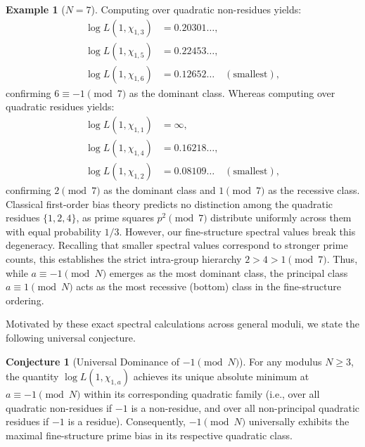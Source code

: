 \documentclass[12pt,reqno]{amsart}
\theoremstyle{definition}
\newtheorem{example}{Example}
\newtheorem{conjecture}[theorem]{Conjecture}
\theoremstyle{remark}
\numberwithin{equation}{section}
\begin{document}
\begin{example}[$N = 7$]
Computing over quadratic non-residues yields:
\begin{align*}
\log L(1, \chi_{1,3}) &= 0.20301\dots, \\
\log L(1, \chi_{1,5}) &= 0.22453\dots, \\
\log L(1, \chi_{1,6}) &= 0.12652\dots \quad (\text{smallest}),
\end{align*}
confirming $6 \equiv -1 \pmod 7$ as the dominant class. 
Whereas computing over quadratic residues yields:
\begin{align*}
\log L(1, \chi_{1,1}) &= \infty, \\
\log L(1, \chi_{1,4}) &= 0.16218\dots, \\
\log L(1, \chi_{1,2}) &= 0.08109\dots \quad (\text{smallest}),
\end{align*}
confirming $2 \pmod 7$ as the dominant class and $1\pmod 7$ as the recessive class.
Classical first-order bias theory predicts no distinction among the quadratic residues $\{1, 2, 4\}$, as prime squares $p^2 \pmod 7$ distribute uniformly across them with equal probability $1/3$. However, our fine-structure spectral values break this degeneracy.
Recalling that smaller spectral values correspond to stronger prime counts, this establishes the strict intra-group hierarchy $2 > 4 > 1 \pmod 7$. Thus, while $a \equiv -1 \pmod N$ emerges as the most dominant class, the principal class $a \equiv 1 \pmod N$ acts as the most recessive (bottom) class in the fine-structure ordering.
\end{example}

Motivated by these exact spectral calculations across general moduli, we state the following universal conjecture.

\begin{conjecture}[Universal Dominance of $-1 \pmod N$]\label{conj:minus_one_dominance}
For any modulus $N \ge 3$, the quantity $\log L(1, \chi_{1,a})$ achieves its unique absolute minimum at $a \equiv -1 \pmod N$ within its corresponding quadratic family (i.e., over all quadratic non-residues if $-1$ is a non-residue, and over all non-principal quadratic residues if $-1$ is a residue). Consequently, $-1 \pmod N$ universally exhibits the maximal fine-structure prime bias in its respective quadratic class.
\end{conjecture}
\end{document}
